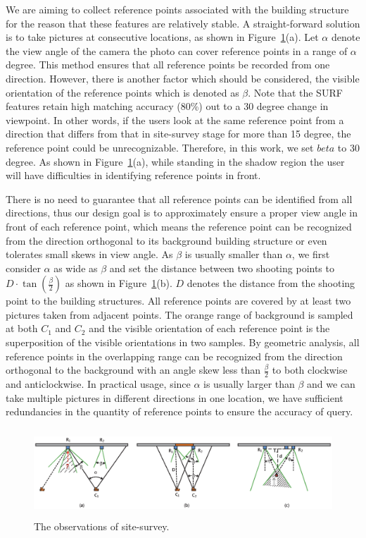We are aiming to collect reference points associated with the building structure for the reason that these features are relatively stable.
A straight-forward solution is to take pictures at consecutive locations, as shown in Figure~\ref{fig_site-survey}(a). Let $\alpha$ denote the view angle of the camera \ie the photo can cover reference points in a range of $\alpha$ degree.
This method ensures that all reference points be recorded from one direction.
However, there is another factor which should be considered, the visible orientation of the reference points which is denoted as $\beta$. Note that the SURF features retain high matching accuracy (80\%) out to a 30 degree change in viewpoint. In other words, if the users look at the same reference point from a direction that differs from that in site-survey stage for more than 15 degree, the reference point could be unrecognizable. Therefore, in this work, we set $beta$ to 30 degree.
As shown in Figure~\ref{fig_site-survey}(a), while standing in the shadow region the user will have difficulties in identifying reference points in front.

There is no need to guarantee that all reference points can be identified from all directions, thus our design goal is to approximately ensure a proper view angle in front of each reference point, which means the reference point can be recognized from the direction orthogonal to its background building structure or even tolerates small skews in view angle. As $\beta$ is usually smaller than $\alpha$, we first consider $\alpha$ as wide as $\beta$ and set the distance between two shooting points to $D\cdot \tan(\frac{\beta}{2})$ as shown in Figure~\ref{fig_site-survey}(b). $D$ denotes the distance from the shooting point to the building structures. All reference points are covered by at least two pictures taken from adjacent points. The orange range of background is sampled at both $C_1$ and $C_2$ and the visible orientation of each reference point is the superposition of the visible orientations in two samples. By geometric analysis, all reference points in the overlapping range can be recognized from the direction orthogonal to the background with an angle skew less than $\frac{\beta}{2}$ to both clockwise and anticlockwise.
In practical usage, since $\alpha$ is usually larger than $\beta$ and we can take multiple pictures in different directions in one location, we have sufficient redundancies in the quantity of reference points to ensure the accuracy of query.
\begin{figure}[!htpb]
\centering
\includegraphics[width=1\linewidth,height=1.3in]{site-survey2.eps}
\caption{The observations of site-survey.}\label{fig_site-survey}
\end{figure}
